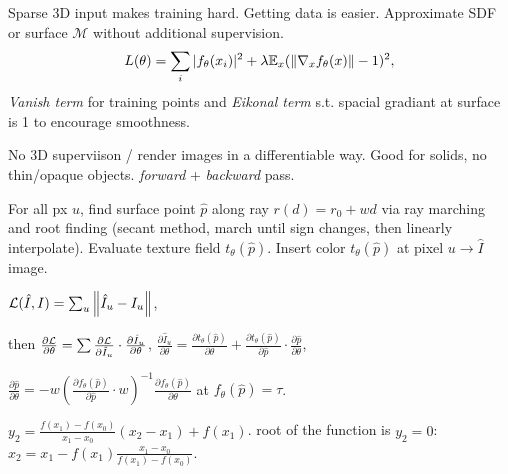 \begin{definition}
    Sparse 3D input makes training hard. Getting data is easier. Approximate SDF or surface \(\mathcal M\) without additional supervision.
    \[L(\theta) = \sum_{i} \vert f_\theta(x_i) \vert^2 + \lambda \mathbb{E}_x(\Vert \nabla_x f_\theta(x)\Vert - 1)^2,\]
    \textit{Vanish term} for training points and \textit{Eikonal term} s.t. spacial gradiant at surface is 1 to encourage smoothness.
\end{definition}

\begin{definition}
    No 3D superviison / render images in a differentiable way. Good for solids, no thin/opaque objects. \textit{forward} + \textit{backward} pass.
\end{definition}

\begin{definition}
    For all px \(u\), find surface point \(\hat p\) along ray \(r(d) = r_0 + wd\) via ray marching and root finding (secant method, march until sign changes, then linearly interpolate). Evaluate texture field \(t_\theta(\hat p)\). Insert color \(t_\theta(\hat p)\) at pixel \(u \to \hat I\)  image.
\end{definition}

\begin{definition}
    \(\mathcal{L}(\hat I, I) = \sum_u \norm{\hat I_u - I_u}\),
    
    then \(\frac{\partial \mathcal{L}}{\partial \theta} = \sum \frac{\partial \mathcal{L}}{\partial \hat I_u} \cdot \frac{\partial \hat I_u}{\partial \theta}\), \(\frac{\partial \hat I_u}{\partial \theta} = \frac{\partial t_\theta(\hat p)}{\partial \theta} + \frac{\partial t_\theta(\hat p)}{\partial \hat p} \cdot \frac{\partial \hat p}{\partial \theta}\),
    
    \(\frac{\partial \hat p}{\partial \theta} = - w\left(\frac{\partial f_\theta(\hat p)}{\partial \hat p} \cdot w\right)^{-1} \frac{\partial f_\theta(\hat p)}{\partial \theta}\) at \(f_\theta(\hat p) = \tau\).
\end{definition}

\begin{definition}
    \(y_2 = \frac{f(x_1) - f(x_0)}{x_1 - x_0}(x_2 - x_1) + f(x_1)\). root of the function is \(y_2 = 0\): \(x_2 = x_1 - f(x_1) \frac{x_1 - x_0}{f(x_1) - f(x_0)}\).
\end{definition}

